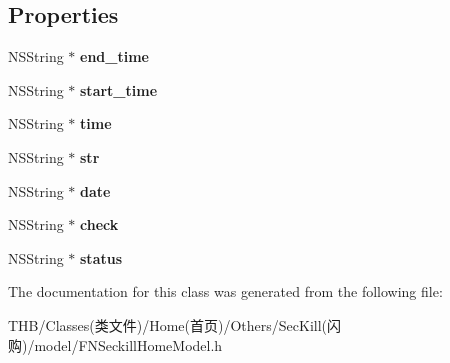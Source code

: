 \subsection*{Properties}
\begin{DoxyCompactItemize}
\item 
\mbox{\label{interface_app___miaosha___time_a7f9f9a616b87db19ae185bddaa960388}} 
N\+S\+String $\ast$ {\bfseries end\+\_\+time}
\item 
\mbox{\label{interface_app___miaosha___time_a118ea5cda2a1b05dba6b09bd2f84e300}} 
N\+S\+String $\ast$ {\bfseries start\+\_\+time}
\item 
\mbox{\label{interface_app___miaosha___time_a2b55316c7903d310bc565a8cbd972c71}} 
N\+S\+String $\ast$ {\bfseries time}
\item 
\mbox{\label{interface_app___miaosha___time_afb573c5c2ff11ec4c08ee21850a23ba7}} 
N\+S\+String $\ast$ {\bfseries str}
\item 
\mbox{\label{interface_app___miaosha___time_a457f6d49f81522cb50be620a59f73409}} 
N\+S\+String $\ast$ {\bfseries date}
\item 
\mbox{\label{interface_app___miaosha___time_ac4d7e4296b73e943166cdc1fb06de111}} 
N\+S\+String $\ast$ {\bfseries check}
\item 
\mbox{\label{interface_app___miaosha___time_a096b3e128a6701e5c7b1be5ee7dd0ff5}} 
N\+S\+String $\ast$ {\bfseries status}
\end{DoxyCompactItemize}


The documentation for this class was generated from the following file\+:\begin{DoxyCompactItemize}
\item 
T\+H\+B/\+Classes(类文件)/\+Home(首页)/\+Others/\+Sec\+Kill(闪购)/model/F\+N\+Seckill\+Home\+Model.\+h\end{DoxyCompactItemize}
